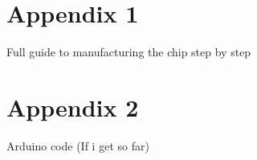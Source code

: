 \documentclass[final]{jyflluk}
\begin{document}
\nocite{*}

\printbibliography
\appendix

\section{Appendix 1}
\label{sec:appendix1}
Full guide to manufacturing the chip step by step

\section{Appendix 2}
\label{sec:appendix2}
Arduino code (If i get so far)
\end{document}
